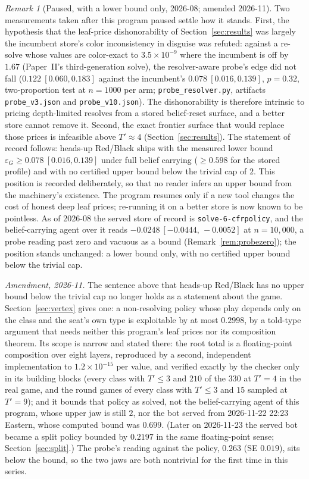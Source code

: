 \documentclass[11pt]{article}
\theoremstyle{plain}
\theoremstyle{definition}
\theoremstyle{remark}
\newtheorem{remark}[theorem]{Remark}
\newcommand{\code}[1]{\texttt{\small #1}}
\newcommand{\game}{\ensuremath{G}}
\newcommand{\epsG}{\ensuremath{\varepsilon_{\game}}}
\begin{document}
\begin{remark}[Paused, with a lower bound only, 2026-08; amended
2026-11]\label{rem:paused}
Two measurements taken after this program paused settle how it stands.
First, the hypothesis that the leaf-price dishonorability of
Section~\ref{sec:results} was largely the incumbent store's color
inconsistency in disguise was refuted: against a re-solve whose values
are color-exact to $3.5\times10^{-9}$ where the incumbent is off by
$1.67$ (Paper~II's third-generation solve), the resolver-aware probe's
edge did not fall ($0.122\ [0.060,0.183]$ against the incumbent's
$0.078\ [0.016,0.139]$, $p=0.32$, two-proportion test at $n=1000$ per
arm; \code{probe\_resolver.py}, artifacts \code{probe\_v3.json} and
\code{probe\_v10.json}). The dishonorability is therefore intrinsic to
pricing depth-limited resolves from a stored belief-reset surface, and
a better store cannot remove it. Second, the exact frontier surface
that would replace those prices is infeasible above $T'\approx4$
(Section~\ref{sec:results}). The statement of record follows: heads-up
Red/Black ships with the measured lower bound
$\epsG\ge0.078\ [0.016,0.139]$ under full belief carrying ($\ge0.598$
for the stored profile) and with no certified upper bound below the
trivial cap of $2$. This position is recorded deliberately, so that no
reader infers an upper bound from the machinery's existence. The
program resumes only if a new tool changes the cost of honest deep
leaf prices; re-running it on a better store is now known to be
pointless. As of 2026-08 the served store of record is
\code{solve-6-cfrpolicy}, and the belief-carrying agent over it reads
$-0.0248\ [-0.0444,\,-0.0052]$ at $n=10{,}000$, a probe reading past
zero and vacuous as a bound (Remark~\ref{rem:probezero}); the
position stands unchanged: a lower bound only, with no certified
upper bound below the trivial cap.

\emph{Amendment, 2026-11.} The sentence above that heads-up Red/Black
has no upper bound below the trivial cap no longer holds as a statement
about the game. Section~\ref{sec:vertex} gives one: a non-resolving
policy whose play depends only on the class and the seat's own type is
exploitable by at most $0.2998$, by a told-type argument that needs
neither this program's leaf prices nor its composition theorem. Its
scope is narrow and stated there: the root total is a floating-point
composition over eight layers, reproduced by a second, independent
implementation to $1.2\times10^{-15}$ per value, and verified exactly
by the checker only in its building blocks (every class with $T'\le3$
and $210$ of the $330$ at $T'=4$ in the real game, and the round games
of every class with $T'\le3$ and $15$ sampled at $T'=9$); and it bounds
that policy as solved, not the belief-carrying agent of this program,
whose upper jaw is still $2$, nor the bot served from 2026-11-22
22:23 Eastern, whose computed bound was $0.699$. (Later on 2026-11-23
the served bot became a split policy bounded by $0.2197$ in the same
floating-point sense; Section~\ref{sec:split}.) The probe's reading against the
policy, $0.263$ (SE $0.019$), sits below the bound, so the two jaws are
both nontrivial for the first time in this series.
\end{remark}
\end{document}
